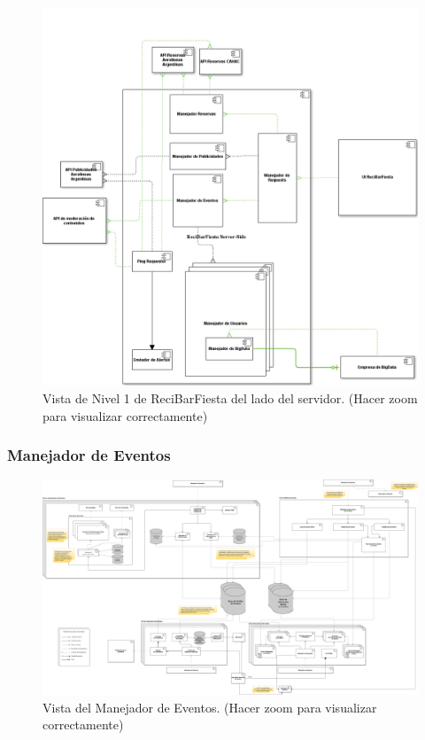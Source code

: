 \begin{figure}[H]
  \centering
  \includegraphics[width=\textwidth]{diagramas/ReciBarFiesta.png}
  \caption{\normalfont Vista de Nivel 1 de ReciBarFiesta del lado del servidor. (Hacer zoom para visualizar correctamente)}
\end{figure} 

\subsubsection{Manejador de Eventos}

\begin{figure}[H]
  \centering
  \includegraphics[width=\textwidth]{diagramas/ManejadorDeEventos.png}
  \caption{\normalfont Vista del Manejador de Eventos. (Hacer zoom para visualizar correctamente)}
\end{figure} 

